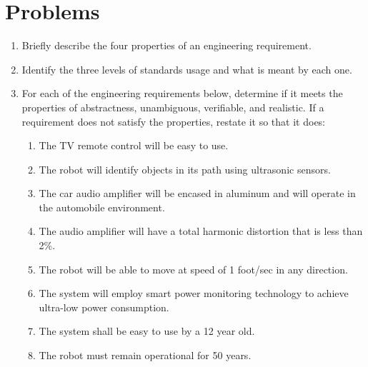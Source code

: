 \section{Problems}
\label{section:reqSpecProblems}

\begin{enumerate}
\def\labelenumi{\arabic{enumi}.}
\item
  Briefly describe the four properties of an engineering requirement.
\item
  Identify the three levels of standards usage and what is meant by each
  one.
\item
  For each of the engineering requirements below, determine if it meets
  the properties of abstractness, unambiguous, verifiable, and
  realistic. If a requirement does not satisfy the properties, restate
  it so that it does:


\begin{enumerate}
\def\labelenumi{\alph{enumi})}
\item
  The TV remote control will be easy to use.
\item
  The robot will identify objects in its path using ultrasonic sensors.
\item
  The car audio amplifier will be encased in aluminum and will operate
  in the automobile environment.
\item
  The audio amplifier will have a total harmonic distortion that is less
  than 2\%.
\item
  The robot will be able to move at speed of 1 foot/sec in any
  direction.
\item
  The system will employ smart power monitoring technology to achieve
  ultra-low power consumption.
\item
  The system shall be easy to use by a 12 year old.
\item
  The robot must remain operational for 50 years.
\end{enumerate}


\end{enumerate}
